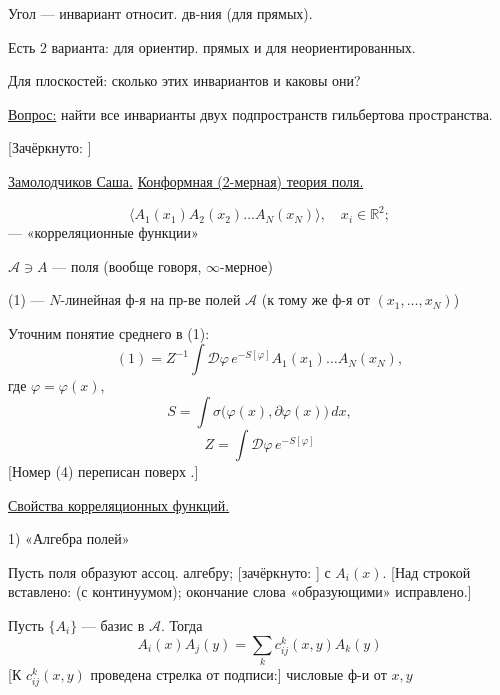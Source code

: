 Угол — инвариант относит. дв-ния (для прямых).

Есть 2 варианта: для ориентир. прямых и для неориентированных.

Для плоскостей: сколько этих инвариантов и каковы они?

\underline{Вопрос:} найти все инварианты двух подпространств гильбертова пространства.

[Зачёркнуто: ]

\underline{Замолодчиков Саша.}\qquad
\underline{Конформная (2-мерная) теория поля.}

\begin{equation*}
\langle A_1(x_1)A_2(x_2)\ldots A_N(x_N)\rangle,\quad x_i\in\mathbb{R}^2;
\tag{1}
\end{equation*}
— «корреляционные функции»

$\mathcal A\ni A$ — поля (вообще говоря, $\infty$-мерное)

(1) — $N$-линейная ф-я на пр-ве полей $\mathcal A$
(к тому же ф-я от $(x_1,\ldots,x_N)$)

Уточним понятие среднего в (1):
\begin{equation*}
(1)=Z^{-1}\int\mathcal D\varphi\,e^{-S[\varphi]}A_1(x_1)\ldots A_N(x_N),
\tag{2}
\end{equation*}
где $\varphi=\varphi(x)$,
\begin{equation*}
S=\int\sigma\bigl(\varphi(x),\partial\varphi(x)\bigr)\,dx,
\tag{3}
\end{equation*}
\begin{equation*}
Z=\int\mathcal D\varphi\,e^{-S[\varphi]}
\tag{4}
\end{equation*}
[Номер (4) переписан поверх .]

\underline{Свойства корреляционных функций.}

1) «Алгебра полей»

Пусть поля образуют ассоц. алгебру;
[зачёркнуто: ]
с  $A_i(x)$.
[Над строкой вставлено: (с континуумом); окончание слова «образующими» исправлено.]

Пусть $\{A_i\}$ — базис в $\mathcal A$. Тогда
\begin{equation*}
A_i(x)A_j(y)=\sum_k c_{ij}^k(x,y)A_k(y)
\end{equation*}
[К $c_{ij}^k(x,y)$ проведена стрелка от подписи:] числовые ф-и от $x,y$

